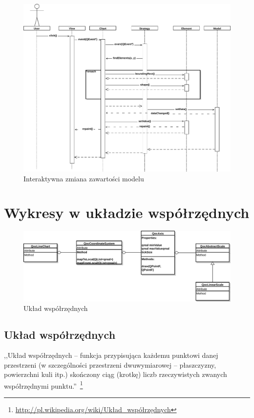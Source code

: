 \begin{figure}[H]
\centering
\includegraphics[scale=0.6]{img/seq_inter.pdf}
\caption{Interaktywna zmiana zawartości modelu}\label{rys:seq:inter}
\end{figure}

\section{Wykresy w układzie współrzędnych}

\begin{figure}[H]
\centering
\includegraphics[scale=0.65]{img/os_skala.pdf}
\caption{Układ współrzędnych}\label{rys:os:skala}
\end{figure}

\subsection{Układ współrzędnych}
,,Układ współrzędnych -- funkcja przypisująca każdemu punktowi danej przestrzeni (w szczególności przestrzeni dwuwymiarowej -- płaszczyzny, powierzchni kuli itp.) skończony ciąg (krotkę) liczb rzeczywistych zwanych współrzędnymi punktu.''~\footnote{\url{http://pl.wikipedia.org/wiki/Układ\_współrzędnych}}

